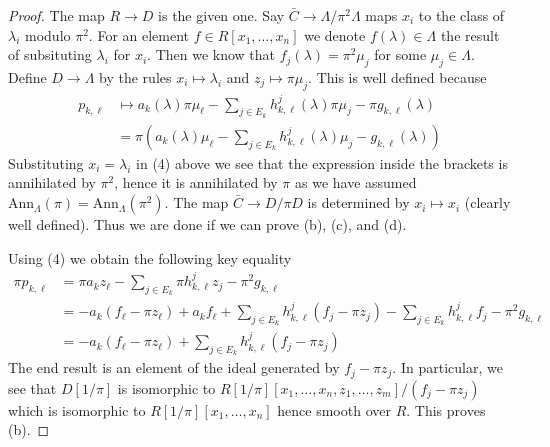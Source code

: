 \begin{proof}
\medskip\noindent
The map $R \to D$ is the given one.
Say $\bar C \to \Lambda/\pi^2\Lambda$ maps $x_i$
to the class of $\lambda_i$ modulo $\pi^2$. For an element
$f \in R[x_1, \ldots, x_n]$ we denote $f(\lambda) \in \Lambda$
the result of subsituting $\lambda_i$ for $x_i$. Then we know that
$f_j(\lambda) = \pi^2 \mu_j$ for some $\mu_j \in \Lambda$.
Define $D \to \Lambda$ by the rules $x_i \mapsto \lambda_i$ and
$z_j \mapsto \pi\mu_j$. This is well defined because
\begin{align*}
p_{k, \ell} & \mapsto
a_k(\lambda) \pi \mu_\ell -
\sum\nolimits_{j \in E_k} h_{k, \ell}^j(\lambda) \pi \mu_j
- \pi g_{k, \ell}(\lambda) \\
& =
\pi\left(a_k(\lambda) \mu_\ell -
\sum\nolimits_{j \in E_k} h_{k, \ell}^j(\lambda) \mu_j
- g_{k, \ell}(\lambda)\right)
\end{align*}
Substituting $x_i = \lambda_i$ in (4) above we see that the expression
inside the brackets is annihilated by $\pi^2$, hence it is annihilated
by $\pi$ as we have assumed
$\text{Ann}_\Lambda(\pi) = \text{Ann}_\Lambda(\pi^2)$.
The map $\bar C \to D/\pi D$ is determined by $x_i \mapsto x_i$
(clearly well defined). Thus we are done if we can prove (b), (c), and (d).

\medskip\noindent
Using (4) we obtain the following key equality
\begin{align*}
\pi p_{k, \ell} & =
\pi a_k z_\ell - \sum\nolimits_{j \in E_k} \pi h_{k, \ell}^jz_j
- \pi^2 g_{k, \ell} \\
& =
- a_k (f_\ell - \pi z_\ell) + a_k f_\ell +
\sum\nolimits_{j \in E_k} h_{k, \ell}^j (f_j - \pi z_j) -
\sum\nolimits_{j \in E_k} h_{k, \ell}^j f_j - \pi^2 g_{k, \ell} \\
& =
-a_k(f_\ell - \pi z_\ell) +
\sum\nolimits_{j \in E_k} h_{k, \ell}^j(f_j - \pi z_j)
\end{align*}
The end result is an element of the ideal generated by $f_j - \pi z_j$.
In particular, we see that $D[1/\pi]$ is isomorphic to
$R[1/\pi][x_1, \ldots, x_n, z_1, \ldots, z_m]/(f_j - \pi z_j)$
which is isomorphic to $R[1/\pi][x_1, \ldots, x_n]$ hence smooth
over $R$. This proves (b).


\end{proof}
